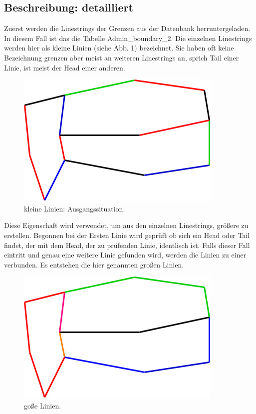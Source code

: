 \documentclass[a4paper, 12pt]{article}
\begin{document}
\subsection{Beschreibung: detailliert}
Zuerst werden die Linestrings der Grenzen aus der Datenbank herruntergeladen. In diesem Fall ist das die Tabelle Admin_boundary_2.
Die einzelnen Linestrings werden hier als kleine Linien (siehe Abb. 1) bezeichnet. Sie haben oft keine Bezeichnung grenzen aber meist an weiteren Linestrings an, sprich Tail einer Linie, ist meist der Head einer anderen.
\begin{figure}[H]
  \includegraphics[scale=0.7]{Dokumentation/kleineLinien.png}
  \caption{kleine Linien: Ausgangssituation.}
  \label{fig:kleineLinien}
\end{figure}
Diese Eigenschaft wird verwendet, um aus den einzelnen Linestrings, größere zu erstellen. Begonnen bei der Ersten Linie wird geprüft ob sich ein Head oder Tail findet, der mit dem Head, der zu prüfenden Linie, identlisch ist. Falls dieser Fall eintritt und genau eine weitere Linie gefunden wird, werden die Linien zu einer verbunden.  Es entstehen die hier genannten großen Linien.
\begin{figure}[H]
  \includegraphics[scale=0.7]{Dokumentation/grosseLinien.png}
  \caption{goße Linien.}
  \label{fig:grosseLinien}
\end{figure}
\end{document}
